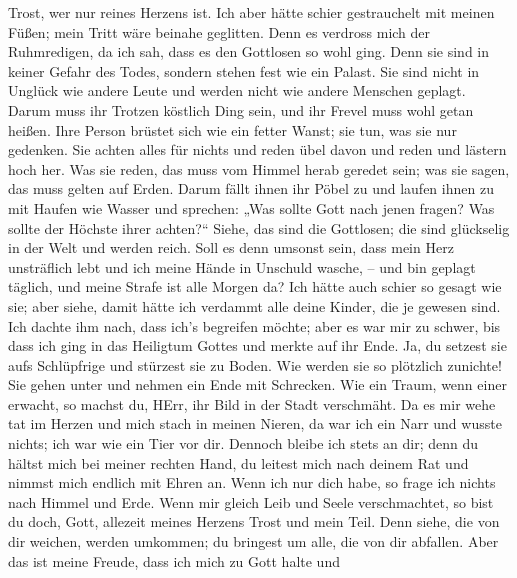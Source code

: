 Trost, wer nur reines Herzens ist.  Ich aber hätte schier
gestrauchelt mit meinen Füßen; mein Tritt wäre beinahe geglitten.
 Denn es verdross mich der Ruhmredigen, da ich sah, dass es
den Gottlosen so wohl ging.  Denn sie sind in keiner Gefahr
des Todes, sondern stehen fest wie ein Palast.  Sie sind
nicht in Unglück wie andere Leute und werden nicht wie andere Menschen
geplagt.  Darum muss ihr Trotzen köstlich Ding sein, und ihr
Frevel muss wohl getan heißen.  Ihre Person brüstet sich wie
ein fetter Wanst; sie tun, was sie nur gedenken.  Sie achten
alles für nichts und reden übel davon und reden und lästern hoch her.
 Was sie reden, das muss vom Himmel herab geredet sein; was
sie sagen, das muss gelten auf Erden.  Darum fällt ihnen
ihr Pöbel zu und laufen ihnen zu mit Haufen wie Wasser  und
sprechen: „Was sollte Gott nach jenen fragen? Was sollte der Höchste
ihrer achten?{}``  Siehe, das sind die Gottlosen; die sind
glückselig in der Welt und werden reich.  Soll es denn
umsonst sein, dass mein Herz unsträflich lebt und ich meine Hände in
Unschuld wasche, --  und bin geplagt täglich, und meine
Strafe ist alle Morgen da?  Ich hätte auch schier so gesagt
wie sie; aber siehe, damit hätte ich verdammt alle deine Kinder, die je
gewesen sind.  Ich dachte ihm nach, dass ich's begreifen
möchte; aber es war mir zu schwer,  bis dass ich ging in
das Heiligtum Gottes und merkte auf ihr Ende.  Ja, du
setzest sie aufs Schlüpfrige und stürzest sie zu Boden. 
Wie werden sie so plötzlich zunichte! Sie gehen unter und nehmen ein
Ende mit Schrecken.  Wie ein Traum, wenn einer erwacht, so
machst du, HErr, ihr Bild in der Stadt verschmäht.  Da es
mir wehe tat im Herzen und mich stach in meinen Nieren,  da
war ich ein Narr und wusste nichts; ich war wie ein Tier vor dir.
 Dennoch bleibe ich stets an dir; denn du hältst mich bei
meiner rechten Hand,  du leitest mich nach deinem Rat und
nimmst mich endlich mit Ehren an.  Wenn ich nur dich habe,
so frage ich nichts nach Himmel und Erde.  Wenn mir gleich
Leib und Seele verschmachtet, so bist du doch, Gott, allezeit meines
Herzens Trost und mein Teil.  Denn siehe, die von dir
weichen, werden umkommen; du bringest um alle, die von dir abfallen.
 Aber das ist meine Freude, dass ich mich zu Gott halte und
